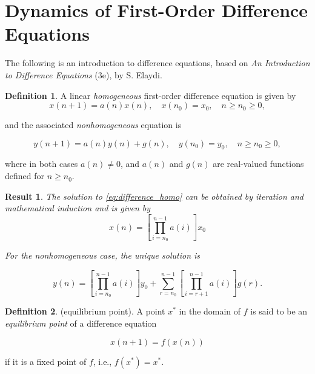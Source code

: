 \documentclass{article}
\theoremstyle{plain}
\newtheorem{res}[thm]{Result}
\theoremstyle{definition}
\newtheorem{defn}{Definition}[section]
\theoremstyle{remark}
\begin{document}
\section{Dynamics of First-Order Difference Equations}

The following is an introduction to difference equations, based on \emph{An Introduction to Difference Equations} (3e), by S. Elaydi.

\begin{defn}
    A linear \emph{homogeneous} first-order difference equation is given by
    \begin{equation}
        x(n+1) = a(n)x(n), \quad x(n_0) = x_0, \quad n \geq n_0 \geq 0, \label{eq:difference_homo}
    \end{equation}

    \noindent and the associated \emph{nonhomogeneous} equation is

    \begin{equation}
        y(n+1) = a(n)y(n) + g(n), \quad y(n_0) = y_0, \quad n \geq n_0 \geq 0, \label{eq:difference_nonhomo}
    \end{equation}

    \noindent where in both cases \(a(n) \neq 0\), and \(a(n)\) and \(g(n)\) are real-valued functions defined for \(n \geq n_0\).
\end{defn}

\begin{res}
    The solution to \eqref{eq:difference_homo} can be obtained by iteration and mathematical induction and is given by
    \begin{equation}
        x(n) = \left[\prod_{i=n_0}^{n-1}a(i)\right] x_0
    \end{equation}

    For the nonhomogeneous case, the unique solution is

    \begin{equation}
        y(n) = \left[\prod_{i=n_0}^{n-1}a(i)\right]y_0 +  \sum_{r=n_0}^{n-1}\left[\prod_{i=r+1}^{n-1}a(i)\right]g(r).
    \end{equation}
\end{res}

\begin{defn} (equilibrium point).
    A point \(x^*\) in the domain of \(f\) is said to be an \emph{equilibrium point} of a difference equation 

    \begin{equation}
        x(n+1) = f(x(n))\label{eq:difference_eq}
    \end{equation} 

    \noindent if it is a fixed point of \(f\), i.e., \(f(x^*) = x^*\).
\end{defn}
\end{document}
